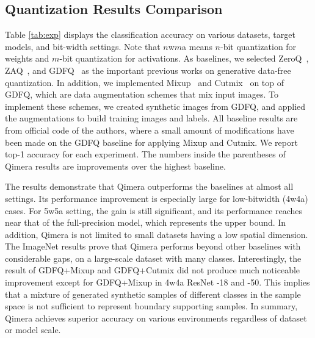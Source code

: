 \documentclass{article}
\newcommand{\aname}{Qimera\xspace}
\newcommand{\JL}[1]{{\color{magenta}[\textbf{\sc JLee}: \textit{#1}]}}
\renewcommand{\JL}[1]{}
\begin{document}
\subsection{Quantization Results Comparison}



Table \ref{tab:exp} displays the classification accuracy on various datasets, target models, and bit-width settings. 
Note that $n$w$m$a means ${n}$-bit quantization for weights and ${m}$-bit quantization for activations. 
As baselines, we selected ZeroQ~\cite{zeroq}, ZAQ~\cite{zaq}, and GDFQ~\cite{gdfq} as the important previous works on generative data-free quantization.
In addition, we implemented Mixup~\cite{mixup} and Cutmix~\cite{cutmix} on top of GDFQ, 
which are data augmentation schemes that mix input images.
To implement these schemes, we created synthetic images from GDFQ, and applied the augmentations to build training images and labels.
All baseline results are from official code of the authors, where a small amount of modifications have been made on the GDFQ baseline for applying Mixup and Cutmix.  
We report top-1 accuracy for each experiment.
The numbers inside the parentheses of \aname results are improvements over the highest baseline.

\JL{recheck below later for updated numbers}
The results demonstrate that \aname outperforms the baselines at almost all settings. 
Its performance improvement is especially large for low-bitwidth (4w4a) cases. For 5w5a setting, the gain is still significant, and its performance reaches near that of the full-precision model,
which represents the upper bound.  
In addition, \aname is not limited to small datasets having a low spatial dimension. 
The ImageNet results prove that \aname performs beyond other baselines with considerable gaps, on a large-scale dataset with many classes.  
Interestingly, the result of GDFQ+Mixup and GDFQ+Cutmix did not produce much noticeable improvement except for GDFQ+Mixup in 4w4a ResNet -18 and -50. 
This implies that a mixture of generated synthetic samples of different classes in the sample space is not sufficient to represent boundary supporting samples.
In summary, \aname achieves superior accuracy on various environments regardless of dataset or model scale.  
\end{document}
